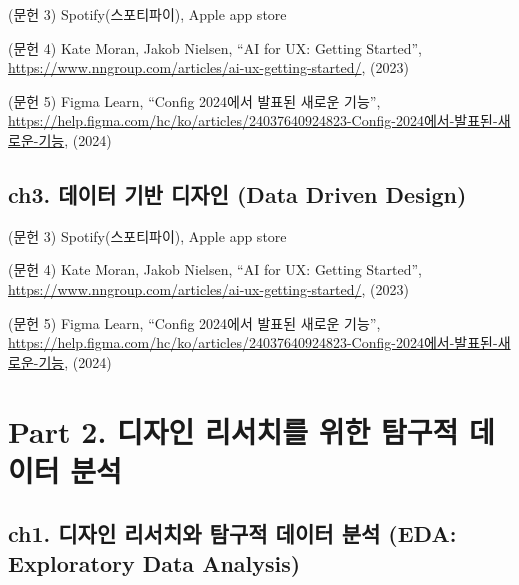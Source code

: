\documentclass[
  letterpaper,
]{book}
\begin{document}

(문헌 3) Spotify(스포티파이), Apple app store

(문헌 4) Kate Moran, Jakob Nielsen, ``AI for UX: Getting Started'',
\url{https://www.nngroup.com/articles/ai-ux-getting-started/}, (2023)

(문헌 5) Figma Learn, ``Config 2024에서 발표된 새로운 기능'',
\url{https://help.figma.com/hc/ko/articles/24037640924823-Config-2024에서-발표된-새로운-기능},
(2024)

\section*{ch3. 데이터 기반 디자인 (Data Driven
Design)}\label{ch3.-uxb370uxc774uxd130-uxae30uxbc18-uxb514uxc790uxc778-data-driven-design-1}


(문헌 3) Spotify(스포티파이), Apple app store

(문헌 4) Kate Moran, Jakob Nielsen, ``AI for UX: Getting Started'',
\url{https://www.nngroup.com/articles/ai-ux-getting-started/}, (2023)

(문헌 5) Figma Learn, ``Config 2024에서 발표된 새로운 기능'',
\url{https://help.figma.com/hc/ko/articles/24037640924823-Config-2024에서-발표된-새로운-기능},
(2024)


\chapter*{Part 2. 디자인 리서치를 위한 탐구적 데이터
분석}\label{part-2.-uxb514uxc790uxc778-uxb9acuxc11cuxce58uxb97c-uxc704uxd55c-uxd0d0uxad6cuxc801-uxb370uxc774uxd130-uxbd84uxc11d-2}


\section*{ch1. 디자인 리서치와 탐구적 데이터 분석 (EDA: Exploratory Data
Analysis)}\label{ch1.-uxb514uxc790uxc778-uxb9acuxc11cuxce58uxc640-uxd0d0uxad6cuxc801-uxb370uxc774uxd130-uxbd84uxc11d-eda-exploratory-data-analysis}
\end{document}
